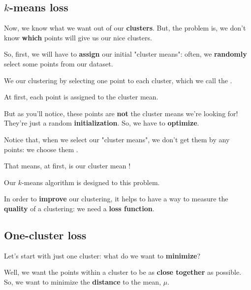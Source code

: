     \subsection*{$k$-means loss}
    
        Now, we know what we want out of our \textbf{clusters}. But, the problem is, we don't know \textbf{which} points will give us our nice clusters. 
        
        So, first, we will have to \textbf{assign} our initial "cluster means": often, we \textbf{randomly} select some points from our dataset.\\
        
        \begin{concept}
            We  our clustering by  selecting one point to  each cluster, which we call the .
            
            At first, each point is assigned to the  cluster mean.
        \end{concept}
        
        But as you'll notice, these points are \textbf{not} the cluster means we're looking for! They're just a random \textbf{initialization}. So, we have to \textbf{optimize}.\\
        
        \begin{clarification}
            Notice that, when we  select our "cluster means", we don't get them by  any points: we choose them .
            
            That means, at first, is our cluster mean !
            
            Our $k$-means algorithm is designed to  this problem.
        \end{clarification}

        
        In order to \textbf{improve} our clustering, it helps to have a way to measure the \textbf{quality} of a clustering: we need a \textbf{loss function}.
    
    \subsection*{One-cluster loss}
    
        Let's start with just one cluster: what do we want to \textbf{minimize}? 
        
        Well, we want the points within a cluster to be as \textbf{close together} as possible. So, we want to minimize the \textbf{distance} to the mean, $\mu$.
        
